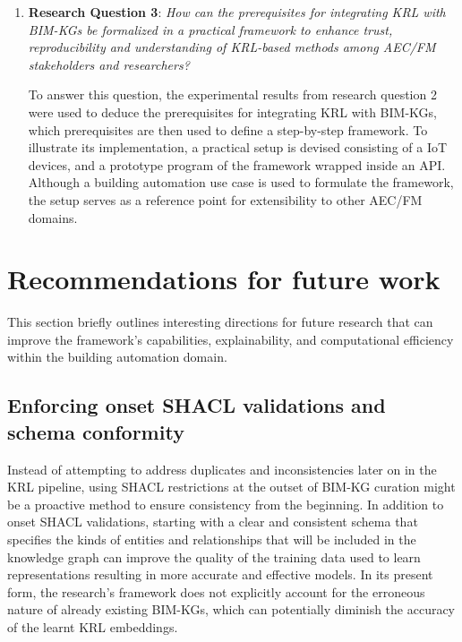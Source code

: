 \begin{enumerate}
    \item
    \textbf{Research Question 3}: \textit{How can the prerequisites for integrating \ac{KRL} with \acp{BIM-KG} be formalized in a practical framework to enhance trust, reproducibility and understanding of \ac{KRL}-based methods among \ac{AEC/FM} stakeholders and researchers?}

    To answer this question, the experimental results from research question 2 were used to deduce the prerequisites for integrating \ac{KRL} with \acp{BIM-KG}, which prerequisites are then used to define a step-by-step framework. To illustrate its implementation, a practical setup is devised consisting of a IoT devices, and a prototype program of the framework wrapped inside an API. Although a building automation use case is used to formulate the framework, the setup serves as a reference point for extensibility to other \ac{AEC/FM} domains.     
\end{enumerate}

\section{Recommendations for future work}
This section briefly outlines interesting directions for future research that can improve the framework's capabilities, explainability, and computational efficiency within the building automation domain.

\subsection{Enforcing onset \ac{SHACL} validations and schema conformity}
Instead of attempting to address duplicates and inconsistencies later on in the \ac{KRL} pipeline, using \ac{SHACL} restrictions at the outset of \ac{BIM-KG} curation might be a proactive method to ensure consistency from the beginning. In addition to onset \ac{SHACL} validations, starting with a clear and consistent schema that specifies the kinds of entities and relationships that will be included in the knowledge graph can improve the quality of the training data used to learn representations resulting in more accurate and effective models. In its present form, the research's framework does not explicitly account for the erroneous nature of already existing \acp{BIM-KG}, which can potentially diminish the accuracy of the learnt \ac{KRL} embeddings.

